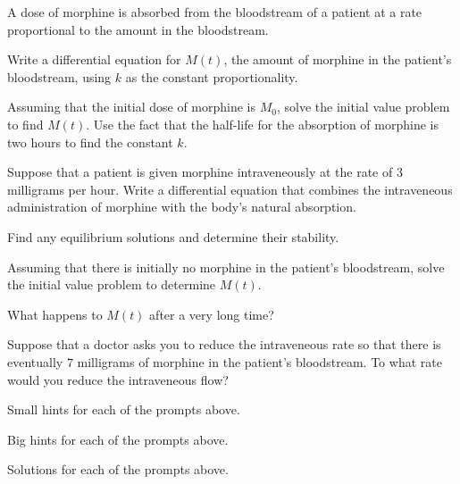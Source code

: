 \begin{activity} \label{A:6.7.iv.drug}  
A dose of morphine is 
        absorbed from the bloodstream of a patient at a rate
        proportional to the amount in the bloodstream.  

        \ba
        \item Write a differential equation for $M(t)$, the amount of
          morphine in the patient's bloodstream, using $k$ as the
          constant proportionality.
        \item 
          Assuming that the initial dose of morphine is $M_0$,
          solve the initial value problem to find $M(t)$.  Use the
          fact that the half-life for the absorption of morphine is
          two hours to find the constant $k$.
        \item Suppose that a patient is given morphine intraveneously
          at the rate of $3$ milligrams per hour.  Write a differential
          equation that combines the intraveneous administration of
          morphine with the body's natural absorption.
        \item Find any equilibrium solutions and determine their
          stability. 
        \item Assuming that there is initially no morphine in the
          patient's bloodstream, solve the initial value problem to
          determine $M(t)$.
        \item What happens to $M(t)$ after a very long time?
        \item Suppose that a doctor asks you to reduce the
          intraveneous rate so that there is eventually $7$ milligrams
          of morphine in the patient's bloodstream.  To what rate
          would you reduce the intraveneous flow?

\ea
\end{activity}
\begin{smallhint}
\ba
	\item Small hints for each of the prompts above.
\ea
\end{smallhint}
\begin{bighint}
\ba
	\item Big hints for each of the prompts above.
\ea
\end{bighint}
\begin{activitySolution}
\ba
	\item Solutions for each of the prompts above.
\ea
\end{activitySolution}
\aftera